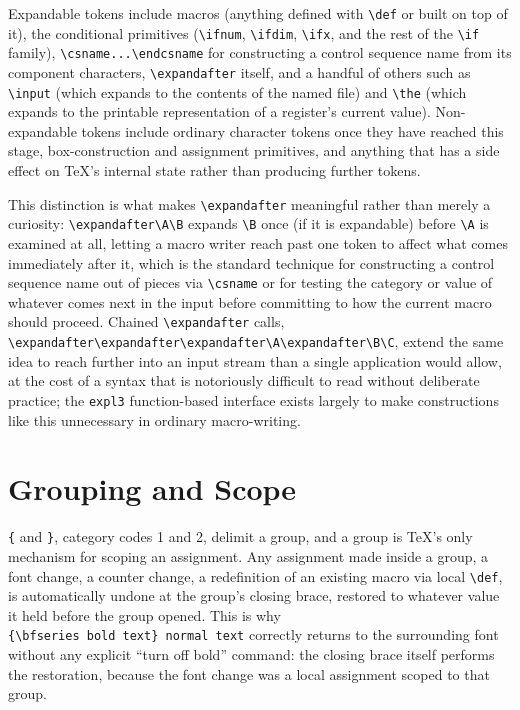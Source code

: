 Expandable tokens include macros (anything defined with \texttt{\textbackslash{}def} or built on top of it), the conditional primitives (\texttt{\textbackslash{}ifnum}, \texttt{\textbackslash{}ifdim}, \texttt{\textbackslash{}ifx}, and the rest of the \texttt{\textbackslash{}if} family), \texttt{\textbackslash{}csname...\textbackslash{}endcsname} for constructing a control sequence name from its component characters, \texttt{\textbackslash{}expandafter} itself, and a handful of others such as \texttt{\textbackslash{}input} (which expands to the contents of the named file) and \texttt{\textbackslash{}the} (which expands to the printable representation of a register's current value). Non-expandable tokens include ordinary character tokens once they have reached this stage, box-construction and assignment primitives, and anything that has a side effect on TeX's internal state rather than producing further tokens.

This distinction is what makes \texttt{\textbackslash{}expandafter} meaningful rather than merely a curiosity: \texttt{\textbackslash{}expandafter\textbackslash{}A\textbackslash{}B} expands \texttt{\textbackslash{}B} once (if it is expandable) before \texttt{\textbackslash{}A} is examined at all, letting a macro writer reach past one token to affect what comes immediately after it, which is the standard technique for constructing a control sequence name out of pieces via \texttt{\textbackslash{}csname} or for testing the category or value of whatever comes next in the input before committing to how the current macro should proceed. Chained \texttt{\textbackslash{}expandafter} calls, \texttt{\textbackslash{}expandafter\textbackslash{}expandafter\textbackslash{}expandafter\textbackslash{}A\textbackslash{}expandafter\textbackslash{}B\textbackslash{}C}, extend the same idea to reach further into an input stream than a single application would allow, at the cost of a syntax that is notoriously difficult to read without deliberate practice; the \texttt{expl3} function-based interface exists largely to make constructions like this unnecessary in ordinary macro-writing.

\hypertarget{a.4-grouping-and-scope}{%
\section{Grouping and Scope}\label{a.4-grouping-and-scope}}

\texttt{\{} and \texttt{\}}, category codes 1 and 2, delimit a group, and a group is TeX's only mechanism for scoping an assignment. Any assignment made inside a group, a font change, a counter change, a redefinition of an existing macro via local \texttt{\textbackslash{}def}, is automatically undone at the group's closing brace, restored to whatever value it held before the group opened. This is why \texttt{\{\textbackslash{}bfseries\ bold\ text\}\ normal\ text} correctly returns to the surrounding font without any explicit ``turn off bold'' command: the closing brace itself performs the restoration, because the font change was a local assignment scoped to that group.

